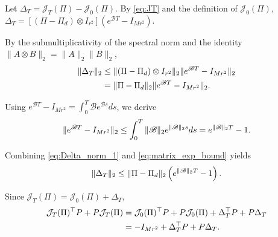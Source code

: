 \documentclass[conference]{IEEEtran}
\begin{document}
	\begin{IEEEproof}
		Let $\Delta_T = \mathcal{J}_T(\Pi) - \mathcal{J}_0(\Pi)$. By \eqref{eq:JT} and the definition of $\mathcal{J}_0(\Pi)$,
		$
		\Delta_T
		=
		\left[
		(\Pi-\Pi_d)\otimes I_{r^2}
		\right]
		\left(
		e^{\mathscr{B}T}
		-
		I_{Mr^2}
		\right).
		\label{eq:DeltaT}			
		$
		
		By the submultiplicativity of the spectral norm and the identity $\|A\otimes B\|_2 = \|A\|_2\|B\|_2$,
		\vspace{-0.2\baselineskip}
		\begin{align}
			\|\Delta_T\|_2
			&\leq
			\|(\Pi-\Pi_d)\otimes I_{r^2}\|_2
			\|e^{\mathscr{B}T} - I_{Mr^2}\|_2
			\nonumber\\
			&=
			\|\Pi-\Pi_d\|_2
			\|e^{\mathscr{B}T} - I_{Mr^2}\|_2.
			\label{eq:Delta_norm_1}	
			\vspace{-0.2\baselineskip}		
		\end{align}
		
		Using $e^{\mathscr{B}T} - I_{Mr^2} = \int_0^T \mathscr{B} e^{\mathscr{B}s} ds$, we derive
		\vspace{-0.2\baselineskip}
		\begin{align}
			\|e^{\mathscr{B}T} - I_{Mr^2}\|_2
			\leq
			\int_0^T
			\|\mathscr{B}\|_2
			e^{\|\mathscr{B}\|_2 s}
			ds
			=
			e^{\|\mathscr{B}\|_2 T}
			-
			1.
			\label{eq:matrix_exp_bound}	
			\vspace{-0.2\baselineskip}		
		\end{align}
		
		Combining \eqref{eq:Delta_norm_1} and \eqref{eq:matrix_exp_bound} yields
		\vspace{-0.2\baselineskip}
		\begin{equation}
			\|\Delta_T\|_2
			\leq
			\|\Pi-\Pi_d\|_2
			\left(
			e^{\|\mathscr{B}\|_2 T}
			-
			1
			\right).
			\label{eq:Delta_norm_bound}		
			\vspace{-0.2\baselineskip}
		\end{equation}
		
		Since $\mathcal{J}_T(\Pi) = \mathcal{J}_0(\Pi) + \Delta_T$, 
		\vspace{-0.2\baselineskip}
		\begin{align}
			\mathcal{J}_T(\Pi)^\top P
			+
			P\mathcal{J}_T(\Pi)
			&=
			\mathcal{J}_0(\Pi)^\top P + P\mathcal{J}_0(\Pi) + \Delta_T^\top P + P\Delta_T
			\nonumber\\
			&=
			-I_{Mr^2} + \Delta_T^\top P + P\Delta_T.
			\label{eq:JT_Lyapunov_expansion}
			\vspace{-0.2\baselineskip}
		\end{align}
		

\end{IEEEproof}
\end{document}
